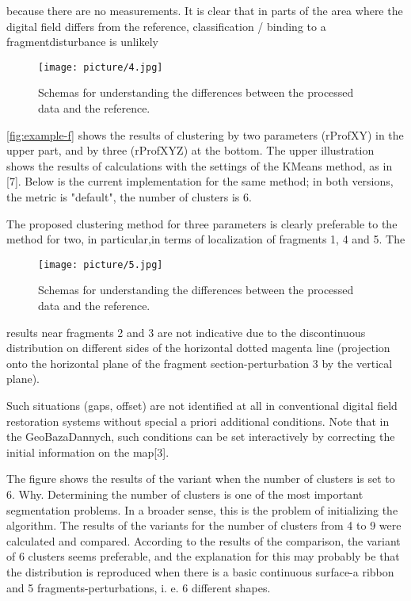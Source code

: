 \documentclass[8pt, a4paper]{article} %
\begin{document}
\begin{multicols}{2}
because there are no measurements. It is clear that in parts of the area where the digital field differs from the reference, classification / binding to a fragmentdisturbance is unlikely

\begin{figure}[H]
    \centering
    \texttt{[image: picture/4.jpg]}
    \caption{\small{Schemas for understanding the differences between the processed data and the reference.}}
    \label{fig:example-d}
\end{figure}

\fontsize{10}{14}
\selectfont 
\quad \autoref{fig:example-f} shows the results of clustering by two parameters (rProfXY) in the upper part, and by three (rProfXYZ) at the bottom. The upper illustration shows the results of calculations with the settings of the KMeans method, as in [7]. Below is the current implementation for the same method; in both versions, the metric is "default", the number of clusters is 6.

\fontsize{10}{14}
\selectfont 
\quad The proposed clustering method for three parameters is clearly preferable to the method for two, in particular,in terms of localization of fragments 1, 4 and 5. The 

\begin{figure}[H]
    \centering
    \texttt{[image: picture/5.jpg]}
    \caption{\small{Schemas for understanding the differences between the processed data and the reference.}}
    \label{fig:example-f}
\end{figure}

results near fragments 2 and 3 are not indicative due to the discontinuous distribution on different sides of the horizontal dotted magenta line (projection onto the horizontal plane of the fragment section-perturbation 3
by the vertical plane).

\fontsize{10}{14}
\selectfont 
\quad
Such situations (gaps, offset) are not identified at all in conventional digital field restoration systems without special a priori additional conditions. Note that in the GeoBazaDannych, such conditions can be set interactively by correcting the initial information on the map[3].

\fontsize{10}{14}
\selectfont 
\quad
The figure shows the results of the variant when
the number of clusters is set to 6. Why. Determining
the number of clusters is one of the most important
segmentation problems. In a broader sense, this is the problem of initializing the algorithm. The results of the variants for the number of clusters from 4 to 9 were calculated and compared. According to the results of the comparison, the variant of 6 clusters seems preferable, and the explanation for this may probably be that the distribution is reproduced when there is a basic continuous
surface-a ribbon and 5 fragments-perturbations, i. e. 6 different shapes.


\end{multicols}
\end{document}
